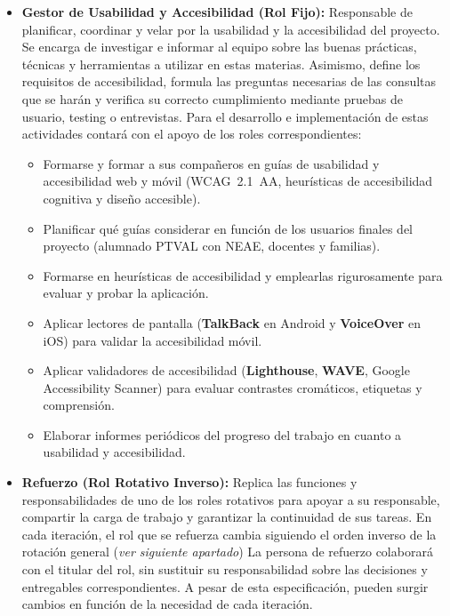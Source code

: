 \begin{itemize}[leftmargin=*]
\begin{itemize}
      \item Asegurarse de que se organiza bien el trabajo: celebración regular de reuniones, toma de actas formales, reparto equitativo de tareas y uso de recursos hardware y software correctos.
      \item Revisar o asegurarse de que se revisen y prueben todos los entregables (verificando correctitud y completitud) y de que se finalizan a tiempo o se planifica adecuadamente cualquier cambio de fecha y sus consecuencias.
      \item Supervisar los criterios de aceptación, revisiones de código, análisis estático continuo y auditorías periódicas de calidad del proceso y producto.
    \end{itemize}
  \item \textbf{Gestor de Usabilidad y Accesibilidad (Rol Fijo):} Responsable de planificar, coordinar y velar por la usabilidad y la accesibilidad del proyecto. Se encarga de investigar e informar al equipo sobre las buenas prácticas, técnicas y herramientas a utilizar en estas materias. Asimismo, define los requisitos de accesibilidad, formula las preguntas necesarias de las consultas que se harán y verifica su correcto cumplimiento mediante pruebas de usuario, testing o entrevistas. Para el desarrollo e implementación de estas actividades contará con el apoyo de los roles correspondientes:
    \begin{itemize}
      \item Formarse y formar a sus compañeros en guías de usabilidad y accesibilidad web y móvil (WCAG~2.1~AA, heurísticas de accesibilidad cognitiva y diseño accesible).
      \item Planificar qué guías considerar en función de los usuarios finales del proyecto (alumnado PTVAL con NEAE, docentes y familias).
      \item Formarse en heurísticas de accesibilidad y emplearlas rigurosamente para evaluar y probar la aplicación.
      \item Aplicar lectores de pantalla (\textbf{TalkBack} en Android y \textbf{VoiceOver} en iOS) para validar la accesibilidad móvil.
      \item Aplicar validadores de accesibilidad (\textbf{Lighthouse}, \textbf{WAVE}, Google Accessibility Scanner) para evaluar contrastes cromáticos, etiquetas y comprensión.
      \item Elaborar informes periódicos del progreso del trabajo en cuanto a usabilidad y accesibilidad.
    \end{itemize}
  \item \textbf{Refuerzo (Rol Rotativo Inverso):} Replica las funciones y responsabilidades de uno de los roles rotativos para apoyar a su responsable, compartir la carga de trabajo y garantizar la continuidad de sus tareas. En cada iteración, el rol que se refuerza cambia siguiendo el orden inverso de la rotación general (\textit{ver siguiente apartado}) La persona de refuerzo colaborará con el titular del rol, sin sustituir su responsabilidad sobre las decisiones y entregables correspondientes. A pesar de esta especificación, pueden surgir cambios en función de la necesidad de cada iteración.
\end{itemize}


